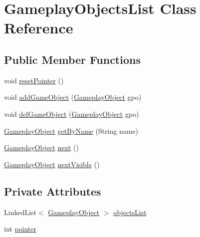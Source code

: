 \hypertarget{classGameplayObjectsList}{\section{Gameplay\-Objects\-List Class Reference}
\label{classGameplayObjectsList}
}
\subsection*{Public Member Functions}
\begin{DoxyCompactItemize}
\item 
void \hyperlink{classGameplayObjectsList_a184ca546acf5b2a6f6212d188c526814}{reset\-Pointer} ()
\item 
void \hyperlink{classGameplayObjectsList_a79d161d85c0207a0d2821e616ee03b9e}{add\-Game\-Object} (\hyperlink{classGameplayObject}{Gameplay\-Object} gpo)
\item 
void \hyperlink{classGameplayObjectsList_aa4e9ea9384811fa31b2c602f5a767446}{del\-Game\-Object} (\hyperlink{classGameplayObject}{Gameplay\-Object} gpo)
\item 
\hyperlink{classGameplayObject}{Gameplay\-Object} \hyperlink{classGameplayObjectsList_af4d3baabb227c988807c086e48ed43a7}{get\-By\-Name} (String name)
\item 
\hyperlink{classGameplayObject}{Gameplay\-Object} \hyperlink{classGameplayObjectsList_a3a882b2fbc9d668bfdfc0ba689955eab}{next} ()
\item 
\hyperlink{classGameplayObject}{Gameplay\-Object} \hyperlink{classGameplayObjectsList_ac0f9be5825684a3973192a1405084b82}{next\-Visible} ()
\end{DoxyCompactItemize}
\subsection*{Private Attributes}
\begin{DoxyCompactItemize}
\item 
Linked\-List$<$ \hyperlink{classGameplayObject}{Gameplay\-Object} $>$ \hyperlink{classGameplayObjectsList_ae07f69f02fab6b47e861477fad9b6749}{objects\-List}
\item 
int \hyperlink{classGameplayObjectsList_a21dae4e14c5c6f1e211dce81ef133129}{pointer}
\end{DoxyCompactItemize}


